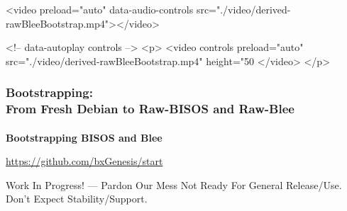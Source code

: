 \begin{whenOrg}
\begin{htmlonly}

\begin{frame}[fragile,plain,label=rawBleeBootstrap]
    \frametitle{}
    \framesubtitle{}
    \begin{presentationMode}
    \begin{rawhtml}
<video preload="auto" data-audio-controls src="./video/derived-rawBleeBootstrap.mp4"></video>
    \end{rawhtml}
    \end{presentationMode}

    \begin{articleMode}
    \begin{rawhtml}
    <!-- data-autoplay  controls -->
    <p>
    <video controls  preload="auto" src="./video/derived-rawBleeBootstrap.mp4" height="50%
    </video>
    </p>
     \end{rawhtml}
    \end{articleMode}
\end{frame}
\end{htmlonly}

\begin{verblatex}

\begin{frame}[fragile,plain,label=rawBleeBootstrap]
    \frametitle{Bootstrapping:\\ From Fresh Debian to Raw-BISOS and Raw-Blee}
    \framesubtitle{}


    \begin{center}
      \begin{large}
        \textbf{Bootstrapping BISOS and Blee}
      \end{large}
  \end{center}

  \begin{center}
    \url{https://github.com/bxGenesis/start}
  \end{center}

\begin{center}
\vspace{0.2in}
\end{center}

\begin{latexonly}
  \begin{alertblock}{Work In Progress! --- Pardon Our Mess}
    Not Ready For General Release/Use. Don't Expect Stability/Support.
  \end{alertblock}
\end{latexonly}


\end{frame}
\end{verblatex}
\end{whenOrg}
